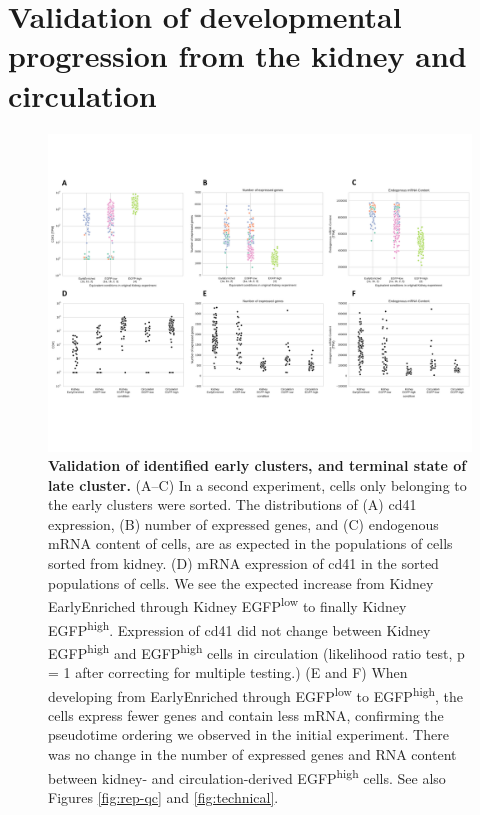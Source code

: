 \section{Validation of developmental progression from the kidney and circulation}

\begin{figure}
    \centering
    \includegraphics[width=\textwidth]{"Figure5"}
    \caption[Validation of identified early clusters, and terminal state of late cluster]{\textbf{Validation of identified early clusters, and terminal state of late cluster.} (A–C) In a second experiment, cells only belonging to the early clusters were sorted. The distributions of (A) cd41 expression, (B) number of expressed genes, and (C) endogenous mRNA content of cells, are as expected in the populations of cells sorted from kidney. (D) mRNA expression of cd41 in the sorted populations of cells. We see the expected increase from Kidney EarlyEnriched through Kidney EGFP\textsuperscript{low} to finally Kidney EGFP\textsuperscript{high}. Expression of cd41 did not change between Kidney EGFP\textsuperscript{high} and EGFP\textsuperscript{high} cells in circulation (likelihood ratio test, p = 1 after correcting for multiple testing.) (E and F) When developing from EarlyEnriched through EGFP\textsuperscript{low} to EGFP\textsuperscript{high}, the cells express fewer genes and contain less mRNA, confirming the pseudotime ordering we observed in the initial experiment. There was no change in the number of expressed genes and RNA content between kidney- and circulation-derived EGFP\textsuperscript{high} cells. See also Figures \ref{fig:rep-qc} and \ref{fig:technical}.}
    \label{fig:replicate}
\end{figure}

